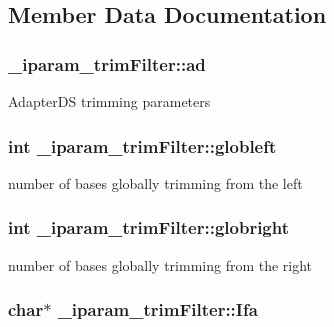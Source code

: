 \subsection{Member Data Documentation}
\hypertarget{struct__iparam__trimFilter_aba4b2762da9029d272905c558986b3f7}{
\subsubsection[{ad}]{ \+\_\+iparam\+\_\+trim\+Filter\+::ad}}\label{struct__iparam__trimFilter_aba4b2762da9029d272905c558986b3f7}
Adapter\+D\+S trimming parameters \hypertarget{struct__iparam__trimFilter_a2e626c5776d4423d20d5ec7606fe9b81}{
\subsubsection[{globleft}]{\setlength{\rightskip}{0pt plus 5cm}int \+\_\+iparam\+\_\+trim\+Filter\+::globleft}}\label{struct__iparam__trimFilter_a2e626c5776d4423d20d5ec7606fe9b81}
number of bases globally trimming from the left \hypertarget{struct__iparam__trimFilter_ad5fb4ca1786b14cd63a8467187474f51}{
\subsubsection[{globright}]{\setlength{\rightskip}{0pt plus 5cm}int \+\_\+iparam\+\_\+trim\+Filter\+::globright}}\label{struct__iparam__trimFilter_ad5fb4ca1786b14cd63a8467187474f51}
number of bases globally trimming from the right \hypertarget{struct__iparam__trimFilter_a55796cd412ef4ca61a5a799d2f64beec}{
\subsubsection[{Ifa}]{\setlength{\rightskip}{0pt plus 5cm}char$\ast$ \+\_\+iparam\+\_\+trim\+Filter\+::\+Ifa}}\label{struct__iparam__trimFilter_a55796cd412ef4ca61a5a799d2f64beec}

